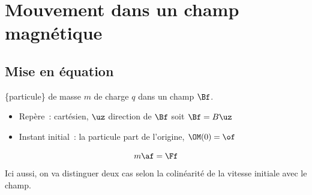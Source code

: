 \documentclass[../../main/main.tex]{subfiles}
\begin{document}
\section{Mouvement dans un champ magnétique}
\subsection{Mise en équation}
\begin{enumerate}[label=\sqenumi]
	 \{particule\} de masse $m$ de charge $q$ dans un champ
	$\Bf$.
	\begin{center}
		\label{fig:chp_B_base}
	\end{center}
	\begin{itemize}[label=$\diamond$, leftmargin=10pt]
		\item Repère~: cartésien, $\uz$ direction de $\Bf$
		      soit $\Bf = B\uz$
		\item Instant initial~: la particule part de l'origine, $\OM(0) =
			      \of$
	\end{itemize}
	\psw{
		\[
			\begin{array}{ll}
				\textbf{Poids}            & \text{négligeable \textbf{devant }}\Ff \\
				\textbf{Force magnétique} & \Ff = q\vf\wedge\Bf =
				\mqty(q\xp                                                         \\q\yp\\q\zp)\wedge\mqty(0\\0\\B)\\
				\Lra                      & \Ff = q\yp B\ux -q\xp B\uy
			\end{array}
		\]
	}
	\[m\af = \Ff\]
	 Ici aussi, on va distinguer deux cas selon la
	colinéarité de la vitesse initiale avec le champ.
\end{enumerate}
\end{document}
